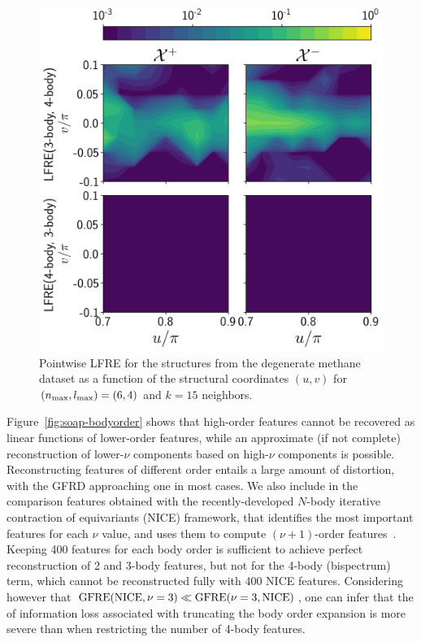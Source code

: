 \begin{figure}
    \centering
    \includegraphics[scale=0.42]{fig/rof/lfre-body_order_comparison-nb_local_neighbours=15-degenerated_manifold.png}
\caption{Pointwise LFRE for the structures from the degenerate methane dataset as a function of the structural coordinates $(u,v)$ for $(n_\mathrm{max},l_\mathrm{max}) = (6,4)$ and $k=15$ neighbors.}
    \label{fig:soap_degenerated_manifold_lfre}
\end{figure}

Figure~\ref{fig:soap-bodyorder} shows that high-order features cannot be recovered as linear functions of lower-order features, while an approximate (if not complete) reconstruction of lower-$\nu$ components based on high-$\nu$ components is possible. Reconstructing features of different order entails a large amount of distortion, with the GFRD approaching one in most cases. 
We also include in the comparison features obtained with the recently-developed $N$-body iterative contraction of equivariants (NICE) framework, that identifies the most important features for each $\nu$ value, and uses them to compute  $(\nu+1)$-order features~\cite{niga+20jcp}. Keeping 400 features for each body order is sufficient to achieve perfect reconstruction of 2 and 3-body features, but not for the 4-body (bispectrum) term, which cannot be reconstructed fully with 400 NICE features. Considering however that $\operatorname{GFRE}(\text{NICE},\nu=3)\ll \operatorname{GFRE}(\nu=3, \text{NICE})$, one can infer that the of information loss associated with truncating the body order expansion is more severe than when restricting the number of 4-body features. 

